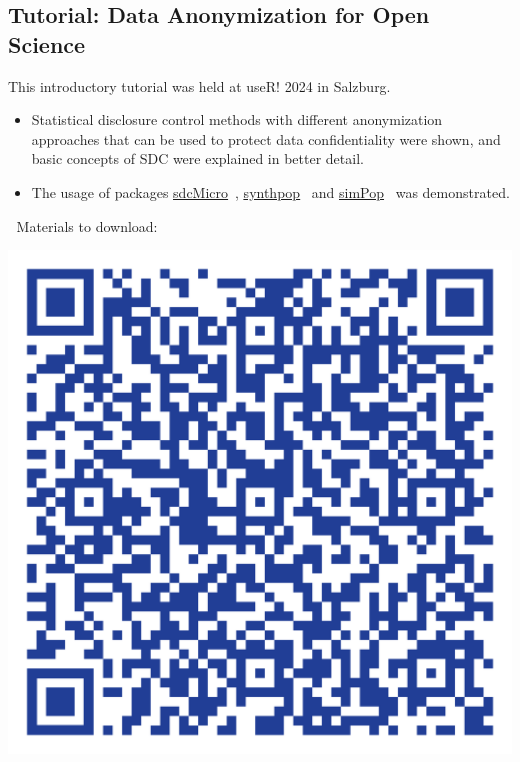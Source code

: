 \documentclass[a0,portrait]{a0poster}
\begin{document}
\begin{multicols}{3}
\section{Tutorial: Data Anonymization for Open Science}

This introductory tutorial was held at useR! 2024 in Salzburg. 

\begin{itemize}
    \item Statistical disclosure control methods with different anonymization approaches that can be used to protect data confidentiality were shown, and basic concepts of SDC were explained in better detail.
    \item The usage of packages \href{https://cran.r-project.org/web/packages/sdcMicro/index.html}{\color{blue}\underline{sdcMicro}}~\cite{2024_Sdcmicro}, \href{https://cran.r-project.org/web/packages/synthpop/index.html} {\color{blue}\underline{synthpop}}~\cite{2022_Synthpop} and \href{https://cran.r-project.org/web/packages/simPop/index.html}{\color{blue}\underline{simPop}}~\cite{2022_Simpop} was demonstrated.    
\end{itemize}

\vspace{1cm}
\textcolor{white}{.} Materials to download: 

\includegraphics[width=0.4\linewidth]{Poster TEX/style/qr-code_useR.png}
\hspace{0.5cm} 


\end{multicols}
\end{document}
